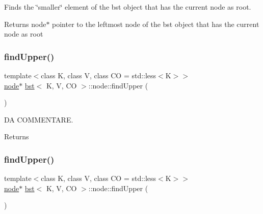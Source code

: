 Finds the \char`\"{}smaller\char`\"{} element of the bst object that has the current node as root. 

\begin{DoxyReturn}{Returns}
node$\ast$ pointer to the leftmost node of the bst object that has the current node as root 
\end{DoxyReturn}
\mbox{\label{structbst_1_1node_a95c26cd3d70b4b8c97506198c1415f94}} 
\subsubsection{\texorpdfstring{find\+Upper()}{findUpper()}\hspace{0.1cm}{\footnotesize\ttfamily [1/2]}}
{\footnotesize\ttfamily template$<$class K, class V, class CO = std\+::less$<$\+K$>$$>$ \\
\hyperlink{structbst_1_1node}{node}$\ast$ \hyperlink{classbst}{bst}$<$ K, V, CO $>$\+::node\+::find\+Upper (\begin{DoxyParamCaption}{ }\end{DoxyParamCaption})\hspace{0.3cm}{\ttfamily [inline]}}



DA C\+O\+M\+M\+E\+N\+T\+A\+RE. 

\begin{DoxyReturn}{Returns}

\end{DoxyReturn}
\mbox{\label{structbst_1_1node_a95c26cd3d70b4b8c97506198c1415f94}} 
\subsubsection{\texorpdfstring{find\+Upper()}{findUpper()}\hspace{0.1cm}{\footnotesize\ttfamily [2/2]}}
{\footnotesize\ttfamily template$<$class K, class V, class CO = std\+::less$<$\+K$>$$>$ \\
\hyperlink{structbst_1_1node}{node}$\ast$ \hyperlink{classbst}{bst}$<$ K, V, CO $>$\+::node\+::find\+Upper (\begin{DoxyParamCaption}{ }\end{DoxyParamCaption})\hspace{0.3cm}{\ttfamily [inline]}}



